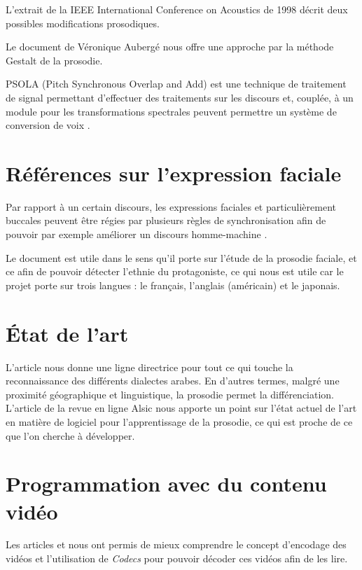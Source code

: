 L'extrait de la IEEE International Conference on Acoustics de 1998 \cite{Acero:ICASSP98-II-881} décrit deux possibles modifications prosodiques.

Le document de Véronique Aubergé \cite{auberge2002gestalt} nous offre une approche par la méthode Gestalt de la prosodie.

PSOLA (Pitch Synchronous Overlap and Add) est une technique de traitement de signal permettant d'effectuer des traitements sur les discours et, couplée, à un module pour les transformations spectrales peuvent permettre un système de conversion de voix \cite{valbret1992voice}.

\section{Références sur l'expression faciale}\label{ref_transfo_faciales}

Par rapport à un certain discours, les expressions faciales et particulièrement buccales peuvent être régies par plusieurs règles de synchronisation afin de pouvoir par exemple améliorer un discours homme-machine \cite{beskow1995rule} .

Le document \cite{matsumoto1992american} est utile dans le sens qu'il porte sur l'étude de la prosodie faciale, et ce afin de pouvoir détecter l'ethnie du protagoniste, ce qui nous est utile car le projet porte sur trois langues : le français, l'anglais (américain) et le japonais.


\section{État de l'art}\label{state_of_the_art}

L'article \cite{rouas2006identification} nous donne une ligne directrice pour tout ce qui touche la reconnaissance des différents dialectes arabes. En d'autres termes, malgré une proximité géographique et linguistique, la prosodie permet la différenciation.
L'article de la revue en ligne Alsic \cite{10.4000/alsic.332} nous apporte un point sur l'état actuel de l'art en matière de logiciel pour l'apprentissage de la prosodie, ce qui est proche de ce que l'on cherche à développer.

\section{Programmation avec du contenu vidéo}

Les articles \cite{ghanbari1999video} et \cite{he2013introduction} nous ont permis de mieux comprendre le concept d'encodage des vidéos et l'utilisation de \textit{Codecs} pour pouvoir décoder ces vidéos afin de les lire.


